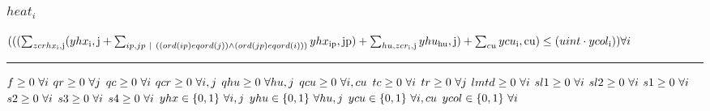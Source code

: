\documentclass[11pt]{article}
\begin{document}
\subsubsection*{$heat_{i}$}
$
(((\sum_{zcrhx_\text{i},\text{j}} (yhx_\text{i},\text{j} + \sum_{ip,jp ~ | ~ ((ord(ip) eq ord(j)) \wedge (ord(jp) eq ord(i)))} yhx_\text{ip},\text{jp}) + \sum_{hu,zcr_\text{i},\text{j}} yhu_\text{hu},\text{j}) + \sum_{cu} ycu_\text{i},\text{cu}) \leq (uint \cdot ycol_\text{i}))\hfill \forall i
$
\vspace{5pt}
\hrule
\bigskip
$f\geq 0 ~ \forall i\\$
$qr\geq 0 ~ \forall j\\$
$qc\geq 0 ~ \forall i\\$
$qcr\geq 0 ~ \forall i,j\\$
$qhu\geq 0 ~ \forall hu,j\\$
$qcu\geq 0 ~ \forall i,cu\\$
$tc\geq 0 ~ \forall i\\$
$tr\geq 0 ~ \forall j\\$
$lmtd\geq 0 ~ \forall i\\$
$sl1\geq 0 ~ \forall i\\$
$sl2\geq 0 ~ \forall i\\$
$s1\geq 0 ~ \forall i\\$
$s2\geq 0 ~ \forall i\\$
$s3\geq 0 ~ \forall i\\$
$s4\geq 0 ~ \forall i\\$
$yhx\in \{0,1\} ~ \forall i,j\\$
$yhu\in \{0,1\} ~ \forall hu,j\\$
$ycu\in \{0,1\} ~ \forall i,cu\\$
$ycol\in \{0,1\} ~ \forall i\\$
\end{document}
